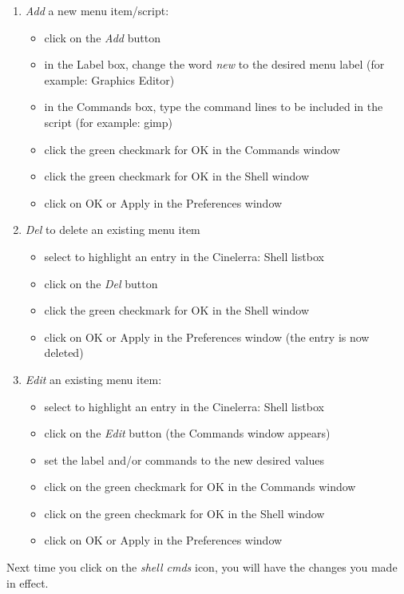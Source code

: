 \begin{enumerate}
	\item \textit{Add} a new menu item/script:
	\begin{itemize}[noitemsep]
		\item click on the \textit{Add} button
		\item in the Label box, change the word \textit{new} to the desired menu label (for example: Graphics Editor)
		\item in the Commands box, type the command lines to be included in the script (for example: gimp)
		\item click the green checkmark for OK in the Commands window
		\item click the green checkmark for OK in the Shell window
		\item click on OK or Apply in the Preferences window
	\end{itemize}
	\item \textit{Del} to delete an existing menu item
	\begin{itemize}[noitemsep]
		\item select to highlight an entry in the Cinelerra: Shell listbox
		\item click on the \textit{Del }button
		\item click the green checkmark for OK in the Shell window
		\item click on OK or Apply in the Preferences window (the entry is now deleted)
	\end{itemize}
	\item \textit{Edit} an existing menu item:
	\begin{itemize}[noitemsep]
		\item select to highlight an entry in the Cinelerra: Shell listbox
		\item click on the \textit{Edit} button (the Commands window appears)
		\item set the label and/or commands to the new desired values
		\item click on the green checkmark for OK in the Commands window
		\item click on the green checkmark for OK in the Shell window
		\item click on OK or Apply in the Preferences window
	\end{itemize} 
\end{enumerate}
	
Next time you click on the \textit{shell cmds} icon, you will have the changes you made in effect.

